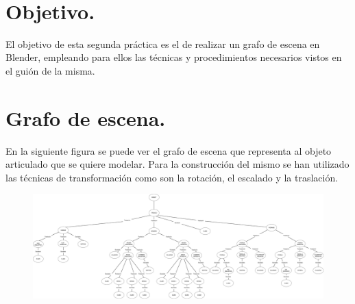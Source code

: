 \documentclass[10pt]{article}
\begin{document}
\begin{center}
 		\\																		%
\vspace{2cm} 																				
\begin{center}																					

 			\end{center}												  						
\end{center}							 											
																					
\newpage																		

\tableofcontents 

\newpage

\section{Objetivo.}

El objetivo de esta segunda práctica es el de realizar un grafo de escena en Blender, empleando para ellos las técnicas y procedimientos necesarios vistos en el guión de la misma.



\section{Grafo de escena.} 

En la siguiente figura se puede ver el grafo de escena que representa al objeto articulado que se quiere modelar. Para la construcción del mismo se han utilizado las técnicas de transformación como son la rotación, el escalado y la traslación. 

\begin{figure}[H]
	\begin{center}
	 		\includegraphics[width = 1.00\textwidth]{Imagenes/p2-img1.png}
	\end{center} 
\end{figure}
\end{document}
